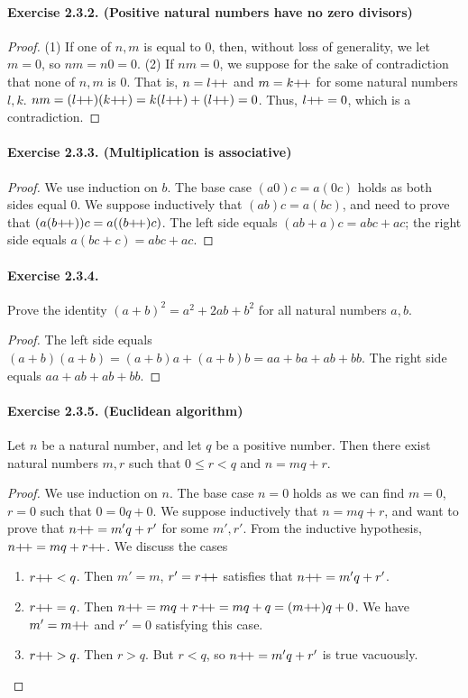 \paragraph{Exercise 2.3.2. (Positive natural numbers have no zero divisors)}
\begin{proof}
    (1) If one of $n,m$ is equal to $0$, then, without loss of generality, we let $m=0$, so $nm=n0=0$.
    (2) If $nm=0$, we suppose for the sake of contradiction that none of $n,m$ is $0$. That is, $n=l{+}{\mkern-3mu}{+}$ and $m=k{+}{\mkern-3mu}{+}$ for some natural numbers $l,k$. $nm=(l{+}{\mkern-3mu}{+})(k{+}{\mkern-3mu}{+})=k(l{+}{\mkern-3mu}{+})+(l{+}{\mkern-3mu}{+})=0$. Thus, $l{+}{\mkern-3mu}{+}=0$, which is a contradiction.
\end{proof}

\paragraph{Exercise 2.3.3. (Multiplication is associative)}
\begin{proof}
    We use induction on $b$. The base case $(a0)c=a(0c)$ holds as both sides equal $0$. We suppose inductively that $(ab)c=a(bc)$, and need to prove that $(a(b{+}{\mkern-3mu}{+}))c=a((b{+}{\mkern-3mu}{+})c)$. The left side equals $(ab+a)c=abc+ac$; the right side equals $a(bc+c)=abc+ac$.
\end{proof}

\paragraph{Exercise 2.3.4.} Prove the identity $(a + b)^2 = a^2 + 2ab + b^2$ for all natural numbers $a, b$.
\begin{proof}
    The left side equals $(a+b)(a+b)=(a+b)a+(a+b)b=aa+ba+ab+bb$. The right side equals $aa+ab+ab+bb$.
\end{proof}

\paragraph{Exercise 2.3.5. (Euclidean algorithm)} Let $n$ be a natural number, and let $q$ be a positive number. Then there exist natural numbers $m,r$ such that $0 \leq r < q$ and $n = mq + r$.
\begin{proof}
    We use induction on $n$. The base case $n=0$ holds as we can find $m=0$, $r=0$ such that $0=0q+0$. We suppose inductively that $n = mq + r$, and want to prove that $n{+}{\mkern-3mu}{+}=m'q+r'$ for some $m',r'$. From the inductive hypothesis, $n{+}{\mkern-3mu}{+}=mq+r{+}{\mkern-3mu}{+}$. We discuss the cases
    \begin{enumerate}[label=(\arabic*)]
        \item $r{+}{\mkern-3mu}{+}<q$. Then $m'=m$, $r'=r{+}{\mkern-3mu}{+}$ satisfies that $n{+}{\mkern-3mu}{+}=m'q+r'$.
        \item $r{+}{\mkern-3mu}{+} = q$. Then $n{+}{\mkern-3mu}{+}=mq+r{+}{\mkern-3mu}{+}=mq+q=(m{+}{\mkern-3mu}{+})q+0$. We have $m'=m{+}{\mkern-3mu}{+}$ and $r'=0$ satisfying this case.
        \item $r{+}{\mkern-3mu}{+} > q$. Then $r>q$. But $r<q$, so $n{+}{\mkern-3mu}{+}=m'q+r'$ is true vacuously.\qedhere
    \end{enumerate}
\end{proof}